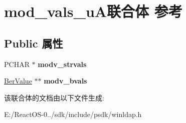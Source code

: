 \hypertarget{unionmod__vals__u_a}{}\section{mod\+\_\+vals\+\_\+u\+A联合体 参考}
\label{unionmod__vals__u_a}
\subsection*{Public 属性}
\begin{DoxyCompactItemize}
\item 
\mbox{\label{unionmod__vals__u_a_ab7101fcfdd94f064b0ad0d3b9b81eb0a}} 
P\+C\+H\+AR $\ast$ {\bfseries modv\+\_\+strvals}
\item 
\mbox{\label{unionmod__vals__u_a_abcd20983f661d967cbcebd0c1fbca3c5}} 
\hyperlink{structberval}{Ber\+Value} $\ast$$\ast$ {\bfseries modv\+\_\+bvals}
\end{DoxyCompactItemize}


该联合体的文档由以下文件生成\+:\begin{DoxyCompactItemize}
\item 
E\+:/\+React\+O\+S-\/0../sdk/include/psdk/winldap.\+h\end{DoxyCompactItemize}

